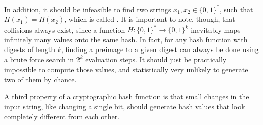In addition, it should be infeasible to find two strings $x_1,x_2 \in\{0,1\}^*$, such that $H(x_1)=H(x_2)$, which is called . It is important to note, though, that collisions always exist, since a function $H: \{0,1\}^* \to \{0,1\}^k$ inevitably maps infinitely many values onto the same hash. In fact, for any hash function with digests of length $k$, finding a preimage to a given digest can always be done using a brute force search in $2^k$ evaluation steps. It should just be practically impossible to compute those values, and statistically very unlikely to generate two of them by chance.

A third property of a cryptographic hash function is that small changes in the input string, like changing a single bit, should generate hash values that look completely different from each other.

